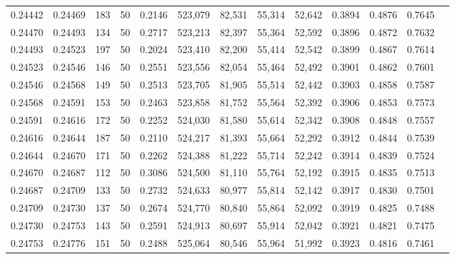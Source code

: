 \begin{tabular}{rrrrrrrrrrrrr}
0.24442 & 0.24469 &   183 &  50 &                                     0.2146 & 523,079 &  82,531 &  55,314 &  52,642 & 0.3894 & 0.4876 & 0.7645 \\
0.24470 & 0.24493 &   134 &  50 &                                     0.2717 & 523,213 &  82,397 &  55,364 &  52,592 & 0.3896 & 0.4872 & 0.7632 \\
0.24493 & 0.24523 &   197 &  50 &                                     0.2024 & 523,410 &  82,200 &  55,414 &  52,542 & 0.3899 & 0.4867 & 0.7614 \\
0.24523 & 0.24546 &   146 &  50 &                                     0.2551 & 523,556 &  82,054 &  55,464 &  52,492 & 0.3901 & 0.4862 & 0.7601 \\
0.24546 & 0.24568 &   149 &  50 &                                     0.2513 & 523,705 &  81,905 &  55,514 &  52,442 & 0.3903 & 0.4858 & 0.7587 \\
0.24568 & 0.24591 &   153 &  50 &                                     0.2463 & 523,858 &  81,752 &  55,564 &  52,392 & 0.3906 & 0.4853 & 0.7573 \\
0.24591 & 0.24616 &   172 &  50 &                                     0.2252 & 524,030 &  81,580 &  55,614 &  52,342 & 0.3908 & 0.4848 & 0.7557 \\
0.24616 & 0.24644 &   187 &  50 &                                     0.2110 & 524,217 &  81,393 &  55,664 &  52,292 & 0.3912 & 0.4844 & 0.7539 \\
0.24644 & 0.24670 &   171 &  50 &                                     0.2262 & 524,388 &  81,222 &  55,714 &  52,242 & 0.3914 & 0.4839 & 0.7524 \\
0.24670 & 0.24687 &   112 &  50 &                                     0.3086 & 524,500 &  81,110 &  55,764 &  52,192 & 0.3915 & 0.4835 & 0.7513 \\
0.24687 & 0.24709 &   133 &  50 &                                     0.2732 & 524,633 &  80,977 &  55,814 &  52,142 & 0.3917 & 0.4830 & 0.7501 \\
0.24709 & 0.24730 &   137 &  50 &                                     0.2674 & 524,770 &  80,840 &  55,864 &  52,092 & 0.3919 & 0.4825 & 0.7488 \\
0.24730 & 0.24753 &   143 &  50 &                                     0.2591 & 524,913 &  80,697 &  55,914 &  52,042 & 0.3921 & 0.4821 & 0.7475 \\
0.24753 & 0.24776 &   151 &  50 &                                     0.2488 & 525,064 &  80,546 &  55,964 &  51,992 & 0.3923 & 0.4816 & 0.7461 \\

\end{tabular}
